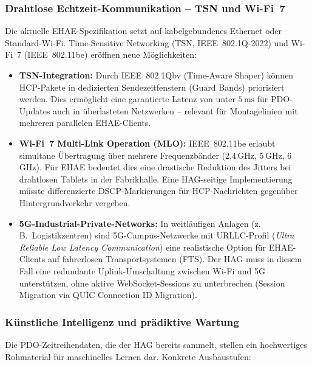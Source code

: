 ﻿\documentclass[12pt,a4paper]{article}
\begin{document}
\subsubsection*{Drahtlose Echtzeit-Kommunikation -- TSN und Wi-Fi~7}

Die aktuelle EHAE-Spezifikation setzt auf kabelgebundenes Ethernet oder Standard-Wi-Fi.
Time-Sensitive Networking (TSN, IEEE~802.1Q-2022) und Wi-Fi~7 (IEEE~802.11be) eröffnen
neue Möglichkeiten:

\begin{itemize}[leftmargin=2em]
  \item \textbf{TSN-Integration:} Durch IEEE~802.1Qbv (Time-Aware Shaper) können
    HCP-Pakete in dedizierten Sendezeitfenstern (Guard Bands) priorisiert werden.
    Dies ermöglicht eine garantierte Latenz von unter $5\,\si{\milli\second}$ für
    PDO-Updates auch in überlasteten Netzwerken -- relevant für
    Montagelinien mit mehreren parallelen EHAE-Clients.
  \item \textbf{Wi-Fi~7 Multi-Link Operation (MLO):} IEEE~802.11be erlaubt
    simultane Übertragung über mehrere Frequenzbänder (2,4\,GHz, 5\,GHz, 6\,GHz).
    Für EHAE bedeutet dies eine drastische Reduktion des Jitters bei
    drahtlosen Tablets in der Fabrikhalle. Eine HAG-seitige Implementierung
    müsste differenzierte DSCP-Markierungen für HCP-Nachrichten gegenüber
    Hintergrundverkehr vergeben.
  \item \textbf{5G-Industrial-Private-Networks:} In weitläufigen Anlagen (z.\,B.\
    Logistikzentren) sind 5G-Campus-Netzwerke mit URLLC-Profil (\emph{Ultra
    Reliable Low Latency Communication}) eine realistische Option für
    EHAE-Clients auf fahrerlosen Transportsystemen (FTS). Der HAG muss in
    diesem Fall eine redundante Uplink-Umschaltung zwischen Wi-Fi und 5G
    unterstützen, ohne aktive WebSocket-Sessions zu unterbrechen (Session
    Migration via QUIC Connection ID Migration).
\end{itemize}

\subsubsection*{Künstliche Intelligenz und prädiktive Wartung}

Die PDO-Zeitreihendaten, die der HAG bereits sammelt, stellen ein hochwertiges
Rohmaterial für maschinelles Lernen dar. Konkrete Ausbaustufen:
\end{document}
